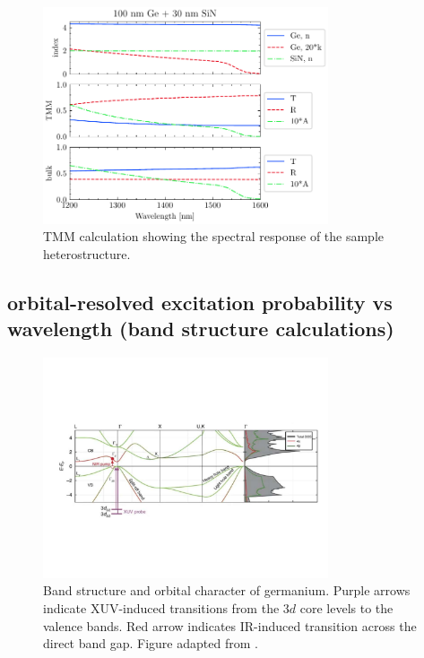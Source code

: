 \begin{figure}
	\centering
	\includegraphics[width=0.75\textwidth]{figures/chap4/tmm_vs_WL_1200-1600nm.pdf}
	\caption{TMM calculation showing the spectral response of the sample heterostructure.}
	\label{fig:tmm_vs_WL_1200-1600nm}
\end{figure}


\subsection{orbital-resolved excitation probability vs wavelength (band structure calculations)}

\begin{figure}
	\centering
	\includegraphics[width=0.75\textwidth]{figures/chap4/Ge_band_diagram_Zurch2017.pdf}
	\caption{Band structure and orbital character of germanium. Purple arrows indicate XUV-induced transitions from the $3d$ core levels to the valence bands. Red arrow indicates IR-induced transition across the direct band gap. Figure adapted from \cite{zurchDirectSimultaneousObservation2017}.}
	\label{fig:Ge_band_diagram}
\end{figure}

